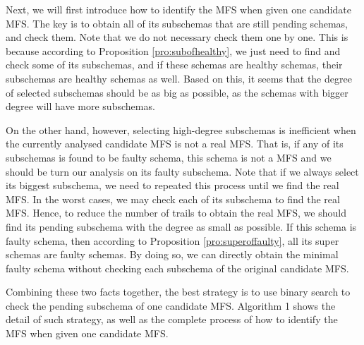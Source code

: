 \documentclass{sig-alternate-05-2015}
\begin{document}
{{Next, we will first introduce how to identify the MFS when given one candidate MFS. The key is to obtain all of its subschemas that are still pending schemas, and check them. Note that we do not necessary check them one by one. This is because according to Proposition \ref{pro:subofhealthy}, we just need to find and check some of its subschemas, and if these schemas are healthy schemas, their subschemas are healthy schemas as well. Based on this, it seems that the degree of selected subschemas should be as big as possible, as the schemas with bigger degree will have more subschemas.


%

On the other hand, however, selecting high-degree subschemas is inefficient when the currently analysed candidate MFS is not a real MFS. That is, if any of its subschemas is found to be faulty schema, this schema is not a MFS and we should be turn our analysis on its faulty subschema. Note that if we always select its biggest subschema, we need to repeated this process until we find the real MFS. In the worst cases, we may check each of its subschema to find the real MFS. Hence, to reduce the number of trails to obtain the real MFS, we should find its pending subschema with the degree as small as possible. If this schema is faulty schema, then according to Proposition \ref{pro:superoffaulty}, all its super schemas are faulty schemas. By doing so, we can directly obtain the minimal faulty schema without checking each subschema of the original candidate MFS.

Combining these two facts together, the best strategy is to use binary search to check the pending subschema of one candidate MFS. %
Algorithm 1 shows the detail of such strategy, as well as the complete process of how to identify the MFS when given one candidate MFS.


}}
\end{document}

